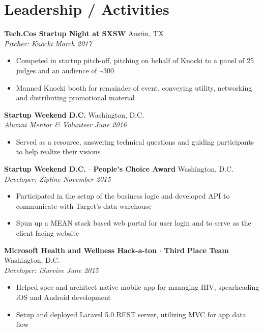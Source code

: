 \documentclass[10pt]{extarticle}
\begin{document}
\section*{Leadership / Activities}
\textbf{Tech.Co\textquotesingle{}s Startup Night at SXSW} \hfill Austin, TX\\
\textit{Pitcher: Knocki \hfill March 2017} \\
\vspace{-1.1em}
\begin{itemize}
  \item Competed in startup pitch-off, pitching on behalf of Knocki to a panel of 25 judges and an audience of {\textasciitilde{}}300
  \item Manned Knocki booth for remainder of event, conveying utility, networking and distributing promotional material
\end{itemize}
\textbf{Startup Weekend D.C.} \hfill Washington, D.C. \\
\textit{Alumni Mentor \& Volunteer \hfill June 2016} \\
\vspace{-1.1em}
\begin{itemize}
  \item Served as a resource, answering technical questions and guiding participants to help realize their visions
\end{itemize}
\textbf{Startup Weekend D.C. $\cdot$ People's Choice Award} \hfill Washington, D.C. \\
\textit{Developer: Zipline \hfill November 2015} \\
\vspace{-1.1em}
\begin{itemize}
  \item Participated in the setup of the business logic and developed API to communicate with Target's data warehouse
  \item Spun up a MEAN stack based web portal for user login and to serve as the client facing website
\end{itemize}
\textbf{Microsoft Health and Wellness Hack-a-ton $\cdot$ Third Place Team} \hfill Washington, D.C. \\
\textit{Developer: iSurvive \hfill June 2015} \\
\vspace{-1.1em}
\begin{itemize}
  \item Helped spec and architect native mobile app for managing HIV, spearheading iOS and Android development
  \item Setup and deployed Laravel 5.0 REST server, utilizing MVC for app data flow
\end{itemize}
\end{document}
